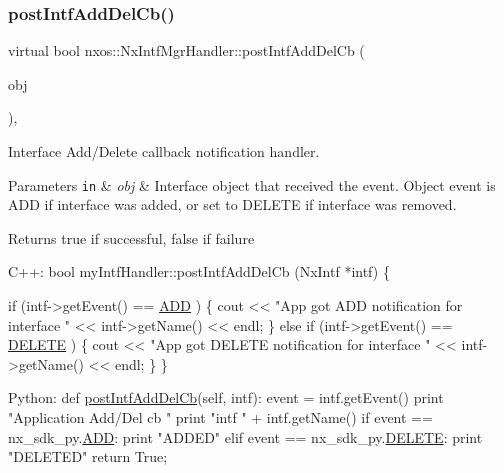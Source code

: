 \subsubsection{\texorpdfstring{post\+Intf\+Add\+Del\+Cb()}{postIntfAddDelCb()}}
{\footnotesize\ttfamily virtual bool nxos\+::\+Nx\+Intf\+Mgr\+Handler\+::post\+Intf\+Add\+Del\+Cb (\begin{DoxyParamCaption}\item[{\mbox{\hyperlink{classnxos_1_1_nx_intf}{Nx\+Intf}} $\ast$}]{obj }\end{DoxyParamCaption})\hspace{0.3cm}{\ttfamily [inline]}, {\ttfamily [virtual]}}

Interface Add/\+Delete callback notification handler. 
\begin{DoxyParams}[1]{Parameters}
\mbox{\tt in}  & {\em obj} & Interface object that received the event. Object event is A\+DD if interface was added, or set to D\+E\+L\+E\+TE if interface was removed. \\
\hline
\end{DoxyParams}
\begin{DoxyReturn}{Returns}
true if successful, false if failure
\end{DoxyReturn}

\begin{DoxyCode}
C++:
   \textcolor{keywordtype}{bool}
   myIntfHandler::postIntfAddDelCb (NxIntf *intf)
   \{
    
   \textcolor{keywordflow}{if} (intf->getEvent() == \mbox{\hyperlink{namespacenxos_af9a9040b7681199d386e94eb888018cba93d8c810253e44a0fd5f3d8d26032ad5}{ADD}} ) \{
      cout << \textcolor{stringliteral}{"App got ADD notification for interface  "} << 
      intf->getName() << endl;
   \} \textcolor{keywordflow}{else} \textcolor{keywordflow}{if} (intf->getEvent() == \mbox{\hyperlink{namespacenxos_af9a9040b7681199d386e94eb888018cba7ec7c9f77651a43ea2562bb5bcb6a3a9}{DELETE}} ) \{
      cout << \textcolor{stringliteral}{"App got DELETE notification for interface "} << 
      intf->getName() << endl;
   \}
   \}  

Python:
   def \mbox{\hyperlink{classnxos_1_1_nx_intf_mgr_handler_afe79bff5ee5b314111e2ce7c7226e73f}{postIntfAddDelCb}}(\textcolor{keyword}{self}, intf):
      event = intf.getEvent()
      print \textcolor{stringliteral}{"Application Add/Del cb "}
      print \textcolor{stringliteral}{"intf "} + intf.getName()
      if event == nx\_sdk\_py.\mbox{\hyperlink{namespacenxos_af9a9040b7681199d386e94eb888018cba93d8c810253e44a0fd5f3d8d26032ad5}{ADD}}:
         print \textcolor{stringliteral}{"ADDED"}
      elif event == nx\_sdk\_py.\mbox{\hyperlink{namespacenxos_af9a9040b7681199d386e94eb888018cba7ec7c9f77651a43ea2562bb5bcb6a3a9}{DELETE}}:
         print \textcolor{stringliteral}{"DELETED"}
      return True;   
\end{DoxyCode}



